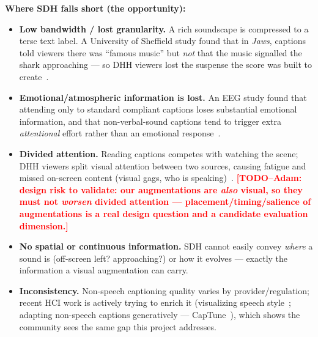 \documentclass[11pt,a4paper]{article}
\newcommand{\TODO}[1]{\textcolor{red}{\textbf{[TODO--Adam: #1]}}}
\begin{document}
\medskip\noindent\textbf{Where SDH falls short (the opportunity):}
\begin{itemize}
  \item \textbf{Low bandwidth / lost granularity.} A rich soundscape is compressed to a terse text
    label. A University of Sheffield study found that in \emph{Jaws}, captions told viewers there was
    ``famous music'' but \emph{not} that the music signalled the shark approaching --- so DHH viewers
    lost the suspense the score was built to create~\cite{sheffield}.
  \item \textbf{Emotional/atmospheric information is lost.} An EEG study found that attending only to
    standard compliant captions loses substantial emotional information, and that non-verbal-sound
    captions tend to trigger extra \emph{attentional} effort rather than an emotional
    response~\cite{captionlimits}.
  \item \textbf{Divided attention.} Reading captions competes with watching the scene; DHH viewers
    split visual attention between two sources, causing fatigue and missed on-screen content (visual
    gags, who is speaking)~\cite{livecaptions}. \TODO{design risk to validate: our augmentations are
    \emph{also} visual, so they must not \emph{worsen} divided attention --- placement/timing/salience
    of augmentations is a real design question and a candidate evaluation dimension.}
  \item \textbf{No spatial or continuous information.} SDH cannot easily convey \emph{where} a sound
    is (off-screen left? approaching?) or how it evolves --- exactly the information a visual
    augmentation can carry.
  \item \textbf{Inconsistency.} Non-speech captioning quality varies by provider/regulation; recent
    HCI work is actively trying to enrich it (visualizing speech style~\cite{prosodycaptions,
    speechstyles}; adapting non-speech captions generatively --- CapTune~\cite{captune}), which shows
    the community sees the same gap this project addresses.
\end{itemize}
\end{document}
